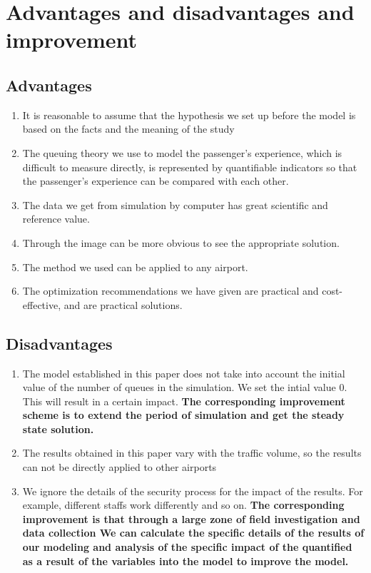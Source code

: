 \section{Advantages and disadvantages and improvement}
\subsection{Advantages}
\begin{enumerate}
\item It is reasonable to assume that the hypothesis we set up before the model is based on the facts and the meaning of the study
\item The queuing theory we use to model the passenger's experience, which is difficult to measure directly, is represented by quantifiable indicators so that the passenger's experience can be compared with each other.
\item The data we get from simulation by computer has great scientific and reference value.
\item Through the image can be more obvious to see the appropriate solution.
\item The method we used can be applied to any airport.
\item The optimization recommendations we have given are practical and cost-effective, and are practical solutions.
\end{enumerate}

\subsection{Disadvantages}
\begin{enumerate}
\item The model established in this paper does not take into account the initial value of the number of queues in the simulation. We set the intial value 0. This will result in a certain impact. \textbf{The corresponding improvement scheme is to extend the period of simulation and get the steady state solution.}
\item The results obtained in this paper vary with the traffic volume, so the results can not be directly applied to other airports
\item We ignore the details of the security process for the impact of the results. For example, different staffs work differently and so on. \textbf{The corresponding improvement is that through a large zone of field investigation and data collection We can calculate the specific details of the results of our modeling and analysis of the specific impact of the quantified as a result of the variables into the model to improve the model.}
\end{enumerate}
